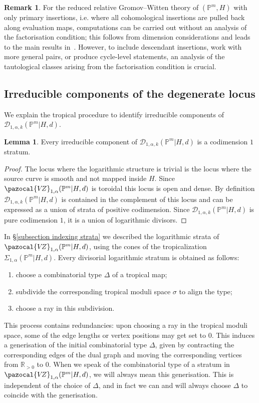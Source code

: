 \documentclass[11pt]{amsart}
\newcommand{\PP}{\mathbb P}
\newcommand{\VZ}{\pazocal{V\!Z}}
\newcommand{\Dcal}{\mathcal{D}}
\newcommand{\RR}{\mathbb{R}}
\theoremstyle{definition}
\newtheorem{lemma}[thm]{Lemma}
\theoremstyle{definition}
\newtheorem{remark}[thm]{Remark}
\begin{document}
\begin{remark} For the reduced relative Gromov--Witten theory of $(\mathbb P^m,H)$ with only primary insertions, i.e. where all cohomological insertions are pulled back along evaluation maps, computations can be carried out without an analysis of the factorisation condition; this follows from dimension considerations and leads to the main results in~\cite{Vre}. However, to include descendant insertions, work with more general pairs, or produce cycle-level statements, an analysis of the tautological classes arising from the factorisation condition is crucial.
\end{remark}

\subsection{Irreducible components of the degenerate locus} We explain the tropical procedure to identify irreducible components of $\Dcal_{1,\alpha,k}(\PP^m|H,d)$.

\begin{lemma} \label{Lemma components are logarithmic divisors} Every irreducible component of $\Dcal_{1,\alpha,k}(\PP^m|H,d)$ is a codimension $1$ stratum.\end{lemma}

\begin{proof} The locus where the logarithmic structure is trivial is the locus where the source curve is smooth and not mapped inside $H$. Since $\VZ_{1,\alpha}(\PP^m|H,d)$ is toroidal this locus is open and dense. By definition $\Dcal_{1,\alpha,k}(\PP^m|H,d)$ is contained in the  complement of this locus and can be expressed as a union of strata of positive codimension. Since $\Dcal_{1,\alpha,k}(\PP^m|H,d)$ is pure codimension $1$, it is a union of logarithmic divisors.\end{proof}

\noindent In \S \ref{subsection indexing strata} we described the logarithmic strata of $\VZ_{1,\alpha}(\PP^m|H,d)$, using the cones of the tropicalization $\Sigma_{1,\alpha}(\PP^m|H,d)$. Every divisorial logarithmic stratum is obtained as follows:
\begin{enumerate}
\item choose a combinatorial type $\Delta$ of a tropical map;
\item subdivide the corresponding tropical moduli space $\sigma$ to align the type;
\item choose a ray in this subdivision.
\end{enumerate}
This process contains redundancies: upon choosing a ray in the tropical moduli space, some of the edge lengths or vertex positions may get set to $0$. This induces a generisation of the initial combinatorial type $\Delta$, given by contracting the corresponding edges of the dual graph and moving the corresponding vertices from $\RR_{>0}$ to $0$. When we speak of the combinatorial type of a stratum in $\VZ_{1,\alpha}(\PP^m|H,d)$, we will always mean this generisation. This is independent of the choice of $\Delta$, and in fact we can and will always choose $\Delta$ to coincide with the generisation.
\end{document}
